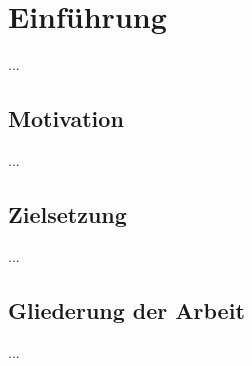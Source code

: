 
\chapter{Einführung}

...

\section{Motivation}

...

\section{Zielsetzung}

...

\section{Gliederung der Arbeit}

...
